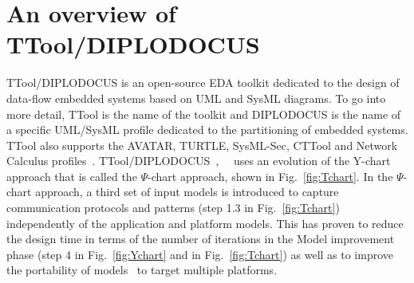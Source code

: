 \documentclass{llncs}
\begin{document}
\section{An overview of TTool/DIPLODOCUS}
\label{sec:Overview}
%
TTool/DIPLODOCUS is an open-source EDA toolkit dedicated to the design of data-flow embedded systems based on UML and
SysML diagrams. To go into more detail, TTool is the name of the toolkit and DIPLODOCUS is the name of a specific UML/SysML
profile dedicated to the partitioning of embedded systems. TTool also supports the AVATAR, TURTLE, SysML-Sec, CTTool and
Network Calculus profiles~\cite{TToolWebSite}. TTool/DIPLODOCUS~\cite{Apvrille06},~\cite{Apvrille08}~\cite{TToolWebSite}
uses an evolution of the Y-chart approach that is called the $\Psi$-chart approach, shown in Fig.~\ref{fig:Tchart}. In
the $\Psi$-chart approach, a third set of input models is introduced to capture communication protocols and patterns
(step 1.3 in Fig.~\ref{fig:Tchart}) independently of the application and platform models. This has proven to reduce the
design time in terms of the number of iterations in the Model improvement phase (step 4 in Fig.~\ref{fig:Ychart} and in
Fig.~\ref{fig:Tchart}) as well as to improve the portability of models~\cite{EnriciThesis} to target multiple
platforms.
%
\end{document}
